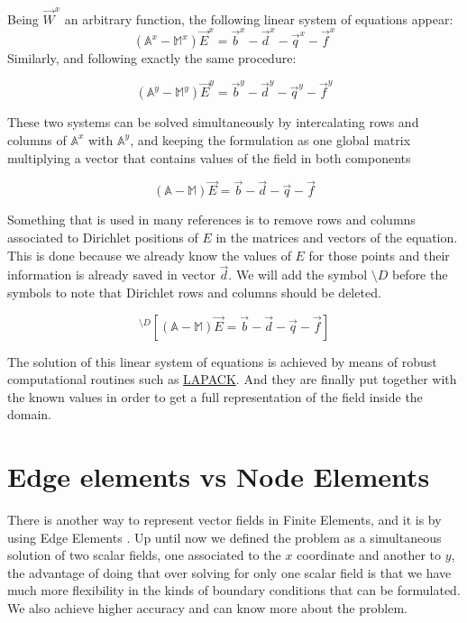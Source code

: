 Being $\vec{W}^x$ an arbitrary function, the following linear system of equations appear:
\begin{equation}
\left(\mathbb{A}^x-\mathbb{M}^x\right)\vec{E}^x = \vec{b}^x-\vec{d}^x-\vec{q}^x-\vec{f}^x \label{eq:harmonic_eq_sys_x}
\end{equation}
Similarly, and following exactly the same procedure:

\begin{equation}
\left(\mathbb{A}^y-\mathbb{M}^y\right)\vec{E}^y = \vec{b}^y-\vec{d}^y-\vec{q}^y-\vec{f}^y \label{eq:harmonic_eq_sys_y}
\end{equation}


These two systems can be solved simultaneously by intercalating rows and columns of $\mathbb{A}^x$ with $\mathbb{A}^y$, and keeping the formulation as one global matrix multiplying a vector that contains values of the field in both components


\begin{equation*}
\left(\mathbb{A}-\mathbb{M}\right)\vec{E} = \vec{b}-\vec{d}-\vec{q}-\vec{f}
\end{equation*}

Something that is used in many references is to remove rows and columns associated to Dirichlet positions of $E$ in the matrices and vectors of the equation. This is done because we already know the values of $E$ for those points and their information is already saved in vector $\vec{d}$. We will add the symbol $\setminus D$ before the symbols to note that Dirichlet rows and columns should be deleted.

\begin{equation*}
^{\setminus D}\left[\left(\mathbb{A}-\mathbb{M}\right)\vec{E}= \vec{b}-\vec{d}-\vec{q}-\vec{f}\right]
\label{eq:harmonic_eq_dirichlet}
\end{equation*}

The solution of this linear system of equations is achieved by means of robust computational routines such as \href{http://www.netlib.org/lapack/}{LAPACK}. And they are finally put together with the known values in order to get a full representation of the field inside the domain.

\section{Edge elements vs Node Elements}
There is another way to represent vector fields in Finite Elements, and it is by using Edge Elements \cite{Jin2010}. Up until now we defined the problem as a simultaneous solution of two scalar fields, one associated to the $x$ coordinate and another to $y$, the advantage of doing that over solving for only one scalar field is that we have much more flexibility in the kinds of boundary conditions that can be formulated. We also achieve higher accuracy and can know more about the problem.

